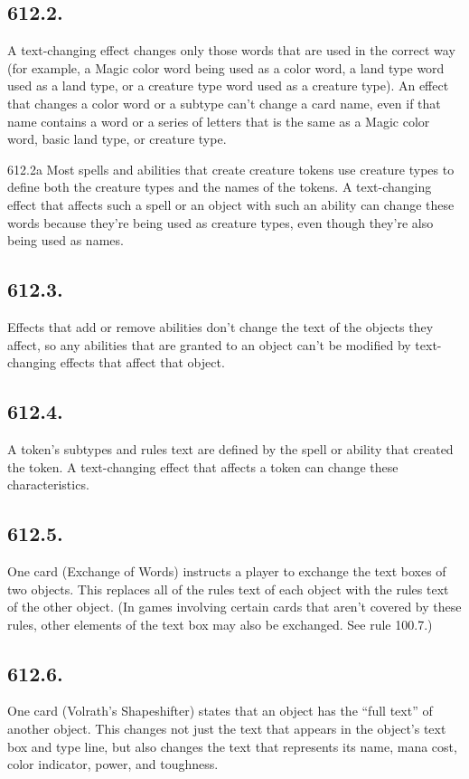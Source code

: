 \subsection*{612.2.}
A text-changing effect changes only those words that are used in the correct way (for example, a Magic color word being used as a color word, a land type word used as a land type, or a creature type word used as a creature type). An effect that changes a color word or a subtype can’t change a card name, even if that name contains a word or a series of letters that is the same as a Magic color word, basic land type, or creature type.

612.2a Most spells and abilities that create creature tokens use creature types to define both the creature types and the names of the tokens. A text-changing effect that affects such a spell or an object with such an ability can change these words because they’re being used as creature types, even though they’re also being used as names.

\subsection*{612.3.}
Effects that add or remove abilities don’t change the text of the objects they affect, so any abilities that are granted to an object can’t be modified by text-changing effects that affect that object.

\subsection*{612.4.}
A token’s subtypes and rules text are defined by the spell or ability that created the token. A text-changing effect that affects a token can change these characteristics.

\subsection*{612.5.}
One card (Exchange of Words) instructs a player to exchange the text boxes of two objects. This replaces all of the rules text of each object with the rules text of the other object. (In games involving certain cards that aren’t covered by these rules, other elements of the text box may also be exchanged. See rule 100.7.)

\subsection*{612.6.}
One card (Volrath’s Shapeshifter) states that an object has the “full text” of another object. This changes not just the text that appears in the object’s text box and type line, but also changes the text that represents its name, mana cost, color indicator, power, and toughness.

